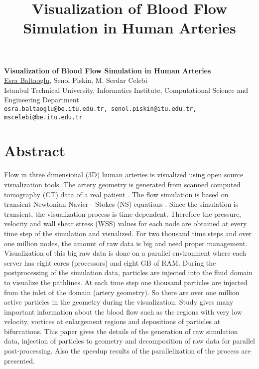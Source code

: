 \title{Visualization of Blood Flow Simulation in Human Arteries}
\author{} \institute{}

\begin{center}
\textbf{\Large Visualization of Blood Flow Simulation in Human Arteries}\\
\vspace{10mm}
{\large \underline{Esra Baltaoglu}, Senol Piskin, M. Serdar Celebi}\\
Istanbul Technical University, Informatics Institute, Computational Science and
Engineering Department\\
{\tt esra.baltaoglu@be.itu.edu.tr, senol.piskin@itu.edu.tr, mscelebi@be.itu.edu.tr}

\end{center}

\section*{Abstract}

Flow in three dimensional (3D) human arteries is visualized using open source visualization tools. The artery geometry is generated from scanned computed tomography (CT) data of a real patient \cite{fsi2009,biomed}. The flow simulation is based on transient Newtonian Navier - Stokes (NS) equations \cite{cfd2010}. Since the simulation is transient, the visualization process is time dependent. Therefore the pressure, velocity and wall shear stress (WSS) values for each node are obtained at every time step of the simulation and visualized. For two thousand time steps and over one million nodes, the amount of raw data is big and need proper management. Visualization of this big raw data is done on a parallel environment where each server has eight cores (processors) and eight GB of RAM. During the postprocessing of the simulation data, particles are injected into the fluid domain to visualize the pathlines. At each time step one thousand particles are injected from the inlet of the domain (artery geometry). So there are over one million active particles in the geometry during the visualization. Study gives many important information about the blood flow such as the regions with very low velocity, vortices at enlargement regions and depositions of particles at bifurcations. This paper 
gives the details of the generation of raw simulation data, injection of particles to geometry and decomposition of raw data for parallel post-processing. Also the speedup results of the parallelization of the process are presented.

